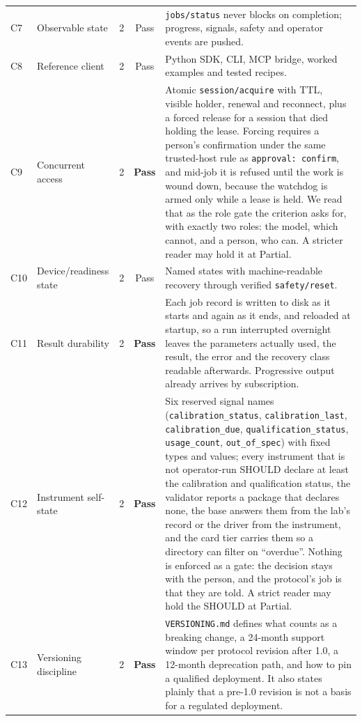 \begin{table}[p]
\begin{tabular}{@{}llcc p{6.6cm}@{}}
C7  & Observable state         & 2 & Pass    & \texttt{jobs/status} never blocks on completion; progress, signals, safety and operator events are pushed. \\
C8  & Reference client         & 2 & Pass    & Python SDK, CLI, MCP bridge, worked examples and tested recipes. \\
C9  & Concurrent access        & 2 & \textbf{Pass} & Atomic \texttt{session/acquire} with TTL, visible holder, renewal and reconnect, plus a forced release for a session that died holding the lease. Forcing requires a person's confirmation under the same trusted-host rule as \texttt{approval: confirm}, and mid-job it is refused until the work is wound down, because the watchdog is armed only while a lease is held. We read that as the role gate the criterion asks for, with exactly two roles: the model, which cannot, and a person, who can. A stricter reader may hold it at Partial. \\
C10 & Device/readiness state   & 2 & Pass    & Named states with machine-readable recovery through verified \texttt{safety/reset}. \\
C11 & Result durability        & 2 & \textbf{Pass} & Each job record is written to disk as it starts and again as it ends, and reloaded at startup, so a run interrupted overnight leaves the parameters actually used, the result, the error and the recovery class readable afterwards. Progressive output already arrives by subscription. \\
C12 & Instrument self-state    & 2 & \textbf{Pass} & Six reserved signal names (\texttt{calibration\_status}, \texttt{calibration\_last}, \texttt{calibration\_due}, \texttt{qualification\_status}, \texttt{usage\_count}, \texttt{out\_of\_spec}) with fixed types and values; every instrument that is not operator-run SHOULD declare at least the calibration and qualification status, the validator reports a package that declares none, the base answers them from the lab's record or the driver from the instrument, and the card tier carries them so a directory can filter on ``overdue''. Nothing is enforced as a gate: the decision stays with the person, and the protocol's job is that they are told. A strict reader may hold the SHOULD at Partial. \\
C13 & Versioning discipline    & 2 & \textbf{Pass} & \texttt{VERSIONING.md} defines what counts as a breaking change, a 24-month support window per protocol revision after 1.0, a 12-month deprecation path, and how to pin a qualified deployment. It also states plainly that a pre-1.0 revision is not a basis for a regulated deployment. \\

\end{tabular}
\end{table}
